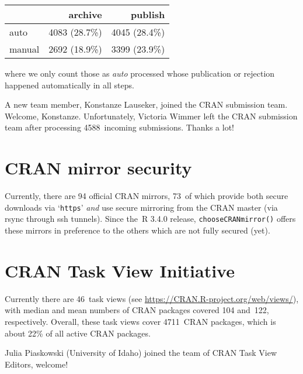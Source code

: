 \begin{longtable}[]{@{}lrr@{}}
\toprule\noalign{}
& archive & publish \\
\midrule\noalign{}
\endhead
\bottomrule\noalign{}
\endlastfoot
auto & 4083 (28.7\%) & 4045 (28.4\%) \\
manual & 2692 (18.9\%) & 3399 (23.9\%) \\
\end{longtable}

\noindent where we only count those as \emph{auto} processed whose publication or
rejection happened automatically in all steps.

A new team member, Konstanze Lauseker, joined the CRAN submission team. Welcome, Konstanze.
Unfortunately, Victoria Wimmer left the CRAN submission team after processing 4588~incoming submissions. Thanks a lot!

\section{CRAN mirror security}\label{cran-mirror-security}

Currently, there are 94 official CRAN mirrors,
73~of which provide both
secure downloads via `\texttt{https}' \emph{and} use secure mirroring from the CRAN master
(via rsync through ssh tunnels). Since the~R 3.4.0 release, \texttt{chooseCRANmirror()}
offers these mirrors in preference to the others which are not fully secured (yet).

\section{CRAN Task View Initiative}\label{cran-task-view-initiative}

Currently there are 46~task views (see \url{https://CRAN.R-project.org/web/views/}),
with median and mean numbers of CRAN packages covered
104 and~122, respectively.
Overall, these task views cover 4711~CRAN packages,
which is about 22\% of all active CRAN packages.

Julia Piaskowski (University of Idaho) joined the team of CRAN Task View Editors, welcome!


\address{%
Kurt Hornik\\
WU Wirtschaftsuniversität Wien\\%
Austria\\
%
%
\textit{ORCiD: \href{https://orcid.org/0000-0003-4198-9911}{0000-0003-4198-9911}}\\%
\href{mailto:Kurt.Hornik@R-project.org}{\nolinkurl{Kurt.Hornik@R-project.org}}%
}

